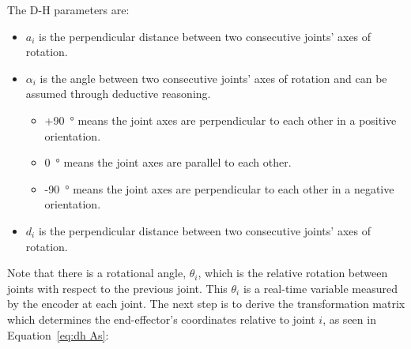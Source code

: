 The D-H parameters are:
\begin{itemize}
	\item $a_i$ is the perpendicular distance between two consecutive joints' axes of rotation.
	\item $\alpha_i$ is the angle between two consecutive joints' axes of rotation and can be assumed through deductive reasoning.
	\begin{itemize}
		\item +\SI{90}{\degree} means the joint axes are perpendicular to each other in a positive orientation.
		\item \SI{0}{\degree} means the joint axes are parallel to each other.
		\item -\SI{90}{\degree} means the joint axes are perpendicular to each other in a negative orientation.
	\end{itemize}
	\item $d_i$ is the perpendicular distance between two consecutive joints' axes of rotation.
\end{itemize}

Note that there is a rotational angle, $\theta_i$, which is the relative rotation between joints with respect to the previous joint. This $\theta_i$ is a real-time variable measured by the encoder at each joint. The next step is to derive the transformation matrix which determines the end-effector's coordinates relative to joint $i$, as seen in Equation~\ref{eq:dh As}:

